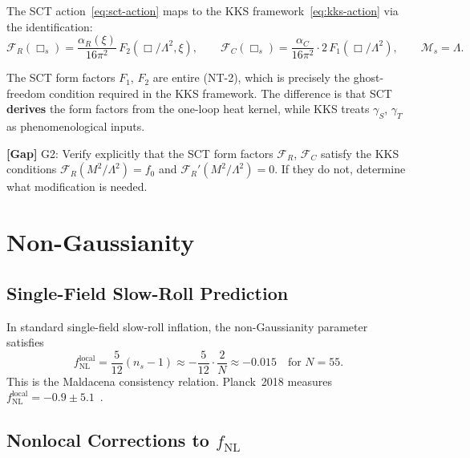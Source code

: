 \documentclass[11pt,a4paper]{article}
\theoremstyle{plain}
\theoremstyle{definition}
\newcommand{\gap}[1]{%
  \par\smallskip\noindent
  \colorbox{yellow!15}{\parbox{\dimexpr\linewidth-2\fboxsep}{%
    \textcolor{orange!70!black}{\textbf{[Gap]}} #1}}%
  \par\smallskip}
\begin{document}
The SCT action~\eqref{eq:sct-action} maps to the KKS
framework~\eqref{eq:kks-action} via the identification:
\begin{equation}\label{eq:sct-kks-map}
  \boxed{
  \mathcal{F}_R(\Box_s) = \frac{\alpha_R(\xi)}{16\pi^2}\,
  F_2(\Box/\Lambda^2,\xi),
  \qquad
  \mathcal{F}_C(\Box_s) = \frac{\alpha_C}{16\pi^2}\cdot 2\,
  F_1(\Box/\Lambda^2),
  \qquad
  \mathcal{M}_s = \Lambda.
  }
\end{equation}

The SCT form factors $F_1$, $F_2$ are entire (NT-2), which is
precisely the ghost-freedom condition required in the KKS framework.
The difference is that SCT \textbf{derives} the form factors from the
one-loop heat kernel, while KKS treats $\gamma_S$, $\gamma_T$ as
phenomenological inputs.

\gap{G2: Verify explicitly that the SCT form factors
$\mathcal{F}_R$, $\mathcal{F}_C$ satisfy the KKS conditions
$\mathcal{F}_R(M^2/\Lambda^2) = f_0$ and
$\mathcal{F}_R'(M^2/\Lambda^2) = 0$.
If they do not, determine what modification is needed.}

\section{Non-Gaussianity}\label{sec:fNL}

\subsection{Single-Field Slow-Roll Prediction}

In standard single-field slow-roll inflation, the non-Gaussianity
parameter satisfies~\cite{Maldacena03,Acquaviva03}
\begin{equation}\label{eq:fNL-slowroll}
  f_{\mathrm{NL}}^{\mathrm{local}} = \frac{5}{12}(n_s - 1)
  \approx -\frac{5}{12}\cdot\frac{2}{N} \approx -0.015
  \quad\text{for } N = 55.
\end{equation}
This is the Maldacena consistency relation. Planck~2018 measures
$f_{\mathrm{NL}}^{\mathrm{local}} = -0.9 \pm 5.1$~\cite{Planck18IX}.

\subsection{Nonlocal Corrections to $f_{\mathrm{NL}}$}
\end{document}
